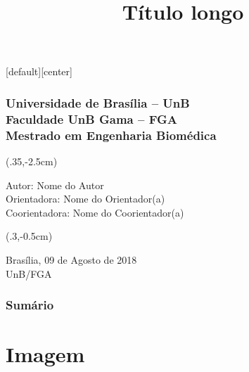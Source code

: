 \documentclass[aspectratio=169]{beamer}
\begin{document}
	\title[Título Curto]{Título longo}
	\date[]{}%
	
	[default][center]
	
	\begin{frame}
	
		\frametitle{\tiny  \textbf{Universidade de Brasília – UnB\\Faculdade UnB Gama – FGA\\ \vspace{0.8mm} Mestrado em Engenharia Biomédica\\ \qquad}}
		\titlepage
		
		\begin{textblock*}{100mm}(.35\textwidth,-2.5cm)
			\begin{flushright}
				\footnotesize
				Autor: Nome do Autor\\
				Orientadora: Nome do Orientador(a)\\
				Coorientadora: Nome do Coorientador(a)
			\end{flushright}
		\end{textblock*}

		\begin{textblock*}{50mm}(.3\textwidth,-0.5cm)
			\begin{center}
				\footnotesize
				Brasília, 09 de Agosto de 2018\\
				UnB/FGA
			\end{center}
		\end{textblock*}

	\end{frame}
	
	\begin{frame}
		\frametitle{Sum\'{a}rio}
		\tableofcontents%
	\end{frame}
	
	\section{Imagem}
\end{document}
